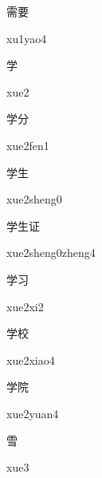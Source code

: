 \begin{multicols*}{2}
\begin{verbete}[xu1yao4]{需要}
\begin{pronuncia}{xu1yao4}
\end{pronuncia}
\end{verbete}

\begin{verbete}[xue2]{学}
\begin{pronuncia}{xue2}
\end{pronuncia}
\end{verbete}

\begin{verbete}{学分}
\begin{pronuncia}{xue2fen1}
\end{pronuncia}
\end{verbete}

\begin{verbete}{学生}
\begin{pronuncia}{xue2sheng0}
\end{pronuncia}
\end{verbete}

\begin{verbete}{学生证}
\begin{pronuncia}{xue2sheng0zheng4}
\end{pronuncia}
\end{verbete}

\begin{verbete}[xue2xi2]{学习}
\begin{pronuncia}{xue2xi2}
\end{pronuncia}
\end{verbete}

\begin{verbete}{学校}
\begin{pronuncia}{xue2xiao4}
\end{pronuncia}
\end{verbete}

\begin{verbete}{学院}
\begin{pronuncia}{xue2yuan4}
\end{pronuncia}
\end{verbete}

\begin{verbete}[xue3]{雪}
\begin{pronuncia}{xue3}
\end{pronuncia}
\end{verbete}

\end{multicols*}
